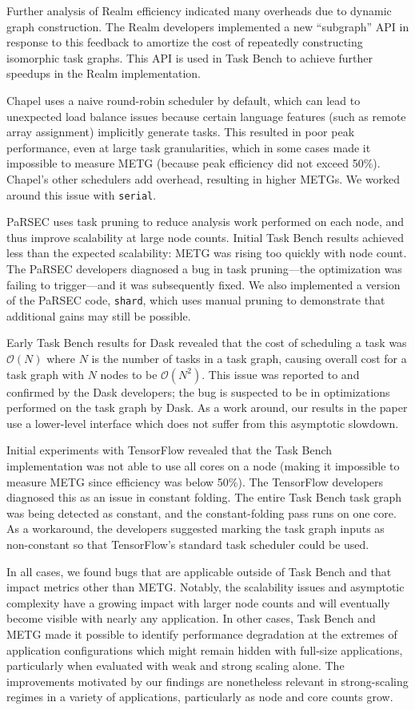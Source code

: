 {\color{blue}
Further analysis of Realm efficiency indicated many overheads due to
dynamic graph construction. The Realm developers implemented a new
``subgraph'' API in response to this feedback to amortize the cost of
repeatedly constructing isomorphic task graphs. This API is used in
Task Bench to achieve further speedups in the Realm implementation.

Chapel uses a naive round-robin scheduler by default, which can lead
to unexpected load balance issues because certain language features
(such as remote array assignment) implicitly generate tasks. This
resulted in poor peak performance, even at large task granularities,
which in some cases made it impossible to measure METG (because peak
efficiency did not exceed 50\%). Chapel's other schedulers add
overhead, resulting in higher METGs. We worked around this issue with
\lstinline{serial}.

PaRSEC uses task pruning to reduce analysis work performed on each
node, and thus improve scalability at large node
counts. Initial Task Bench results achieved less than the expected
scalability: METG was rising too quickly with node count.  The PaRSEC
developers diagnosed a bug in task pruning---the optimization was failing to trigger---and it was
subsequently fixed. We also implemented a version of the PaRSEC code,
\lstinline{shard}, which uses manual pruning to demonstrate that
additional gains may still be possible.

Early Task Bench results for Dask revealed that the cost of scheduling
a task was $\mathcal{O}(N)$ where $N$ is the number of tasks in a task
graph, causing overall cost for a task graph with $N$ nodes to be
$\mathcal{O}(N^2)$. This issue was reported to and confirmed by the
Dask developers; the bug is suspected to be in optimizations performed
on the task graph by Dask. As a work around, our results in the paper use a
lower-level interface which does not suffer from this asymptotic
slowdown.

Initial experiments with TensorFlow revealed that the Task
Bench implementation was not able to use all cores on a node (making it impossible to measure METG since efficiency was below
50\%). The TensorFlow developers diagnosed this as an issue in
constant folding. The entire Task Bench task graph was being detected
as constant, and the constant-folding pass runs on one core. As a
workaround, the developers suggested marking the task graph inputs as
non-constant so that TensorFlow's standard task scheduler could be
used.

In all cases, we found bugs that are applicable outside of Task Bench
and that impact metrics other than METG. Notably, the scalability
issues and asymptotic complexity have a growing impact with larger
node counts and will eventually become visible with nearly any
application. In other cases, Task Bench and METG made it possible to
identify performance degradation at the extremes of application
configurations which might remain hidden with full-size applications,
particularly when evaluated with weak and strong scaling alone. The
improvements motivated by our findings are nonetheless relevant in
strong-scaling regimes in a variety of applications, particularly as
node and core counts grow.

} %

